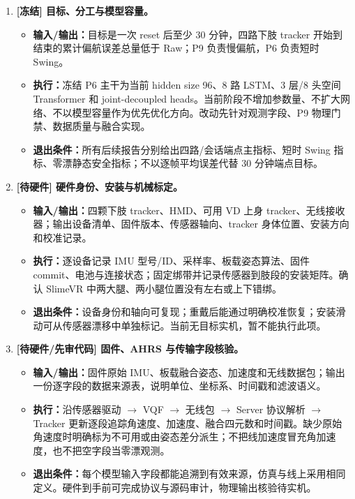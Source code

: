 \documentclass[UTF8,11pt,a4paper]{ctexart}
\begin{document}
\begin{enumerate}
  \item \textbf{[冻结] 目标、分工与模型容量。}
  \begin{itemize}
    \item \textbf{输入/输出：}目标是一次 reset 后至少 30 分钟，四路下肢 tracker 开始到结束的累计偏航误差总量低于 Raw；P9 负责慢偏航，P6 负责短时 Swing。
    \item \textbf{执行：}冻结 P6 主干为当前 hidden size 96、8 路 LSTM、3 层/8 头空间 Transformer 和 joint-decoupled heads。当前阶段不增加参数量、不扩大网络、不以模型容量作为优先优化方向。改动先针对观测字段、P9 物理门禁、数据质量与融合实现。
    \item \textbf{退出条件：}所有后续报告分别给出四路/会话端点主指标、短时 Swing 指标、零漂静态安全指标；不以逐帧平均误差代替 30 分钟端点目标。
  \end{itemize}

  \item \textbf{[待硬件] 硬件身份、安装与机械标定。}
  \begin{itemize}
    \item \textbf{输入/输出：}四颗下肢 tracker、HMD、可用 VD 上身 tracker、无线接收器；输出设备清单、固件版本、传感器轴向、tracker 身体位置、安装方向和校准记录。
    \item \textbf{执行：}逐设备记录 IMU 型号/ID、采样率、板载姿态算法、固件 commit、电池与连接状态；固定绑带并记录传感器到肢段的安装矩阵。确认 SlimeVR 中两大腿、两小腿位置没有左右或上下错绑。
    \item \textbf{退出条件：}设备身份和轴向可复现；重戴后能通过明确校准恢复；安装滑动可从传感器漂移中单独标记。当前无目标实机，暂不能执行此项。
  \end{itemize}

  \item \textbf{[待硬件/先审代码] 固件、AHRS 与传输字段核验。}
  \begin{itemize}
    \item \textbf{输入/输出：}固件原始 IMU、板载融合姿态、加速度和无线数据包；输出一份逐字段的数据来源表，说明单位、坐标系、时间戳和滤波语义。
    \item \textbf{执行：}沿传感器驱动 \(\to\) VQF \(\to\) 无线包 \(\to\) Server 协议解析 \(\to\) Tracker 更新逐段追踪角速度、加速度、融合四元数和时间戳。缺少原始角速度时明确标为不可用或由姿态差分派生；不把线加速度冒充角加速度，也不把空字段当零漂观测。
    \item \textbf{退出条件：}每个模型输入字段都能追溯到有效来源，仿真与线上采用相同定义。硬件到手前可完成协议与源码审计，物理输出核验待实机。
  \end{itemize}


\end{enumerate}
\end{document}
